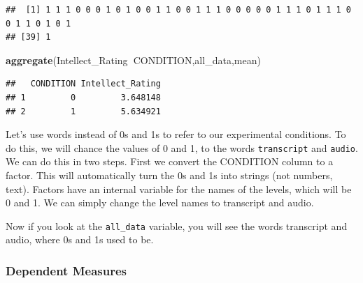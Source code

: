 \documentclass[]{book}
\newenvironment{Shaded}{\begin{snugshade}}{\end{snugshade}}
\newcommand{\KeywordTok}[1]{\textcolor[rgb]{0.13,0.29,0.53}{\textbf{#1}}}
\newcommand{\StringTok}[1]{\textcolor[rgb]{0.31,0.60,0.02}{#1}}
\newcommand{\OperatorTok}[1]{\textcolor[rgb]{0.81,0.36,0.00}{\textbf{#1}}}
\newcommand{\NormalTok}[1]{#1}
\begin{document}
\begin{Shaded}
\end{Shaded}

\begin{verbatim}
##  [1] 1 1 1 0 0 0 1 0 1 0 0 1 1 0 0 1 1 1 0 0 0 0 0 1 1 1 0 1 1 1 0 0 1 1 0 1 0 1
## [39] 1
\end{verbatim}

\begin{Shaded}
\begin{Highlighting}[]
\KeywordTok{aggregate}\NormalTok{(Intellect_Rating}\OperatorTok{~}\NormalTok{CONDITION,all_data,mean)}
\end{Highlighting}
\end{Shaded}

\begin{verbatim}
##   CONDITION Intellect_Rating
## 1         0         3.648148
## 2         1         5.634921
\end{verbatim}

Let's use words instead of 0s and 1s to refer to our experimental
conditions. To do this, we will chance the values of 0 and 1, to the
words \texttt{transcript} and \texttt{audio}. We can do this in two
steps. First we convert the CONDITION column to a factor. This will
automatically turn the 0s and 1s into strings (not numbers, text).
Factors have an internal variable for the names of the levels, which
will be 0 and 1. We can simply change the level names to transcript and
audio.

\begin{Shaded}
\end{Shaded}

Now if you look at the \texttt{all\_data} variable, you will see the
words transcript and audio, where 0s and 1s used to be.

\subsubsection{Dependent Measures}\label{dependent-measures}
\end{document}
